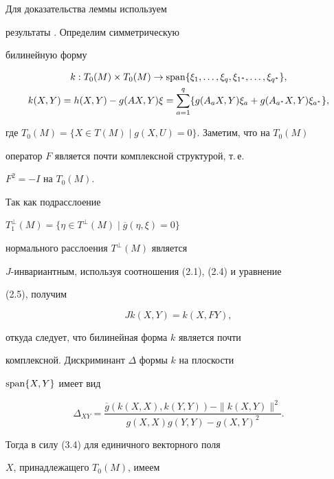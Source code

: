 \begin{pf}


Для доказательства леммы используем


результаты \cite{ONeill}. Определим симметрическую


билинейную форму


\begin{gather*}


k: T_0(M)\times T_0(M)\to


\Span\{\xi_1,\dotsc,\xi_q,\xi_{1^*},\dotsc,\xi_{q^*}\}, \\


k(X,Y)=h(X,Y)-g(AX,Y)\xi=


\sum_{a=1}^q\{g(A_aX,Y)\xi_a+g(A_{a^*}X,Y)\xi_{a^*}\},


\end{gather*}


где $T_0(M)=\{X\in T(M)\mid g(X,U)=0\}$. Заметим, что на $T_0(M)$


оператор $F$ является почти комплексной структурой, т.\,е.


$F^2=-I$ на $T_0(M)$.





Так как подрасслоение


$T_1^\perp(M)=\{\eta\in T^\perp(M)\mid\overline g(\eta,\xi)=0\}$


нормального расслоения $T^\perp(M)$ является


$J$-инвариантным, используя соотношения  (2.1), (2.4) и уравнение


(2.5), получим


\begin{equation}


Jk(X,Y)=k(X,FY),


\end{equation}


откуда следует, что билинейная форма $k$ является почти


комплексной. Дискриминант $\Delta$ формы $k$ на плоскости


$\operatorname{span}\{X,Y\}$ имеет вид


$$


\Delta_{X Y}=\frac{\overline g(k(X,X),k(Y,Y))-\|k(X,Y)\|^2}


{g(X,X)g(Y,Y)-g(X,Y)^2}.


$$


Тогда в силу (3.4) для единичного векторного поля


$X$, принадлежащего $T_0(M)$, имеем



\end{pf}
